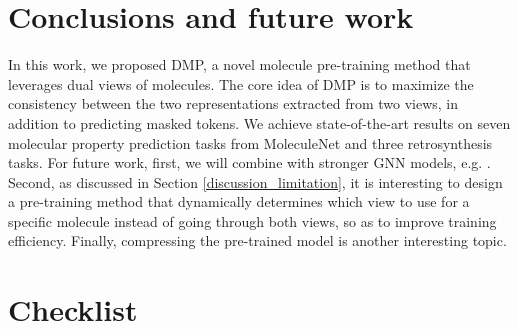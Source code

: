 \documentclass{article}
\newcommand{\ourM}{DMP}
\begin{document}
\section{Conclusions and future work}
In this work, we proposed \ourM{}, a novel molecule pre-training method that leverages dual views of molecules.
The core idea of \ourM{} is to maximize the consistency between the two representations extracted from two views, in addition to predicting masked tokens.
We achieve state-of-the-art results on seven molecular property prediction tasks from MoleculeNet and three retrosynthesis tasks. 
For future work, first, we will combine with stronger GNN models, e.g. \cite{rong2020self,li2020learn}. Second, as discussed in Section \ref{discussion_limitation}, it is interesting to design a pre-training method that dynamically determines which view to use for a specific molecule instead of going through both views, so as to improve training efficiency. Finally, compressing the pre-trained model is another interesting topic. 



{
\small{


}}

\iffalse
\section*{Checklist}
\end{document}
